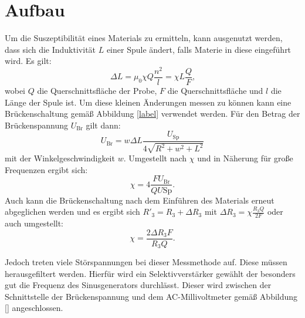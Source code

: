 \section{Aufbau}
\label{sec:Aufbau}

Um die Suszeptibilität eines Materials zu ermitteln, kann ausgenutzt werden, dass sich die Induktivität $L$ einer Spule ändert, falls Materie in diese eingeführt wird. Es gilt:
\begin{equation}
	\Delta L = \mu_0 \chi Q \frac{n^2}{l}=\chi L \frac{Q}{F}\text{,}
\end{equation}
wobei $Q$ die Querschnittsfläche der Probe, $F$ die Querschnittsfläche und $l$ die Länge der Spule ist. Um diese kleinen Änderungen messen zu können kann eine Brückenschaltung gemäß Abbildung \ref{label} verwendet werden. Für den Betrag der Brückenspannung $U_\text{Br}$ gilt dann:
\begin{equation}
	U_\text{Br} = w \Delta L \frac{U_\text{Sp}}{4 \sqrt{R^2+w^2+L^2}}
\end{equation}
mit der Winkelgeschwindigkeit $w$. Umgestellt nach $\chi$ und in Näherung für große Frequenzen ergibt sich:
\begin{equation}
	\chi=4\frac{F U_\text{Br}}{Q U\text{Sp}}\text{.}
\end{equation}
Auch kann die Brückenschaltung nach dem Einführen des Materials erneut abgeglichen werden und es ergibt sich $R'_3 = R_3 + \Delta R_3 $ mit $\Delta R_3 = \chi \frac{R_3 Q}{2 F}$ oder auch umgestellt:
\begin{equation}
	\chi = \frac{2 \Delta R_3 F}{R_3 Q}\text{.}
\end{equation}

Jedoch treten viele Störspannungen bei dieser Messmethode auf. Diese müssen herausgefiltert werden. Hierfür wird ein Selektivverstärker gewählt der besonders gut die Frequenz des Sinusgenerators durchlässt. Dieser wird zwischen der Schnittstelle der Brückenspannung und dem AC-Millivoltmeter gemäß Abbildung \ref{} angeschlossen.